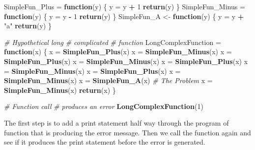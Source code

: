 \documentclass[
]{book}
\newenvironment{Shaded}{\begin{snugshade}}{\end{snugshade}}
\newcommand{\CommentTok}[1]{\textcolor[rgb]{0.56,0.35,0.01}{\textit{#1}}}
\newcommand{\ControlFlowTok}[1]{\textcolor[rgb]{0.13,0.29,0.53}{\textbf{#1}}}
\newcommand{\DecValTok}[1]{\textcolor[rgb]{0.00,0.00,0.81}{#1}}
\newcommand{\KeywordTok}[1]{\textcolor[rgb]{0.13,0.29,0.53}{\textbf{#1}}}
\newcommand{\NormalTok}[1]{#1}
\newcommand{\OperatorTok}[1]{\textcolor[rgb]{0.81,0.36,0.00}{\textbf{#1}}}
\newcommand{\StringTok}[1]{\textcolor[rgb]{0.31,0.60,0.02}{#1}}
\begin{document}
\begin{Shaded}
\begin{Highlighting}[]
\NormalTok{SimpleFun_Plus =}\StringTok{ }\ControlFlowTok{function}\NormalTok{(y) \{}
\NormalTok{    y =}\StringTok{ }\NormalTok{y }\OperatorTok{+}\StringTok{ }\DecValTok{1}
    \KeywordTok{return}\NormalTok{(y)}
\NormalTok{\}}
\NormalTok{SimpleFun_Minus =}\StringTok{ }\ControlFlowTok{function}\NormalTok{(y) \{}
\NormalTok{    y =}\StringTok{ }\NormalTok{y }\OperatorTok{-}\StringTok{ }\DecValTok{1}
    \KeywordTok{return}\NormalTok{(y)}
\NormalTok{\}}
\NormalTok{SimpleFun_A <-}\StringTok{ }\ControlFlowTok{function}\NormalTok{(y) \{}
\NormalTok{    y =}\StringTok{ }\NormalTok{y }\OperatorTok{+}\StringTok{ "a"}
    \KeywordTok{return}\NormalTok{(y)}
\NormalTok{\}}



\CommentTok{# Hypothetical long}
\CommentTok{# complicated}
\CommentTok{# function}
\NormalTok{LongComplexFunction =}\StringTok{ }\ControlFlowTok{function}\NormalTok{(x) \{}
\NormalTok{    x =}\StringTok{ }\KeywordTok{SimpleFun_Plus}\NormalTok{(x)}
\NormalTok{    x =}\StringTok{ }\KeywordTok{SimpleFun_Minus}\NormalTok{(x)}
\NormalTok{    x =}\StringTok{ }\KeywordTok{SimpleFun_Plus}\NormalTok{(x)}
\NormalTok{    x =}\StringTok{ }\KeywordTok{SimpleFun_Minus}\NormalTok{(x)}
\NormalTok{    x =}\StringTok{ }\KeywordTok{SimpleFun_Plus}\NormalTok{(x)}
\NormalTok{    x =}\StringTok{ }\KeywordTok{SimpleFun_Minus}\NormalTok{(x)}
\NormalTok{    x =}\StringTok{ }\KeywordTok{SimpleFun_Plus}\NormalTok{(x)}
\NormalTok{    x =}\StringTok{ }\KeywordTok{SimpleFun_Minus}\NormalTok{(x)}
\NormalTok{    x =}\StringTok{ }\KeywordTok{SimpleFun_A}\NormalTok{(x)  }\CommentTok{# The Problem }
\NormalTok{    x =}\StringTok{ }\KeywordTok{SimpleFun_Minus}\NormalTok{(x)}
    \KeywordTok{return}\NormalTok{(x)}
\NormalTok{\}}

\CommentTok{# Function call}
\CommentTok{# produces an error}
\KeywordTok{LongComplexFunction}\NormalTok{(}\DecValTok{1}\NormalTok{)}
\end{Highlighting}
\end{Shaded}

The first step is to add a print statement half way through the program of function that is producing the error message. Then we call the function again and see if it produces the print statement before the error is generated.
\end{document}
